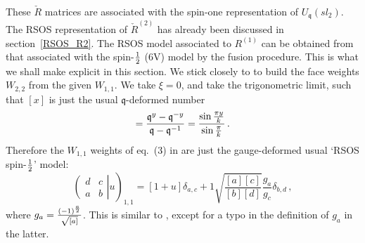 \documentclass[11pt]{article}
\newcommand{\q}{\mathfrak{q}}
\begin{document}
These $\check{R}$ matrices are associated with the spin-one representation of $U_{\mathfrak{q}}\left( sl_2 \right)$. 
The RSOS representation of $\check{R}^{(2)}$ has already been discussed in section~\ref{RSOS_R2}.
The RSOS model associated to $R^{(1)}$ can be obtained from that associated with the spin-$1 \over 2$ (6V) model by the fusion procedure. 
This is what we shall make explicit in this section.
We stick closely to \cite{Date} to build the face weights $W_{2,2}$ from the given $W_{1,1}$. 
We take $\xi = 0$, and take the trigonometric limit, such that $[x]$ is just the usual $\q$-deformed number 
%
\begin{equation}
 [y] = \frac{\mathfrak{q}^{y}-\mathfrak{q}^{-y}}{\mathfrak{q}-\mathfrak{q}^{-1}} = \frac{\sin{\pi y \over k}}{\sin {\pi \over k} } \,.
\end{equation}
%
Therefore the $W_{1,1}$ weights of eq.~(3) in \cite{Date} are just the gauge-deformed usual `RSOS spin-$1 \over 2$' model: 
%
\begin{equation}
 \left. \left( \begin{array}{cc} d & c \\ a & b \end{array} \right| u  \right)_{1,1} = [1+u]\delta_{a,c} + 1\sqrt{\frac{[a][c]}{[b][d]}}\frac{g_a}{g_c}\delta_{b,d} \,,
\end{equation}
%
where $g_a = \frac{(-1)^{a\over 2}}{\sqrt{[a]}}$. This is similar to \cite{Pearce}, except for a typo in the definition of $g_a$ in the latter. 
\end{document}

